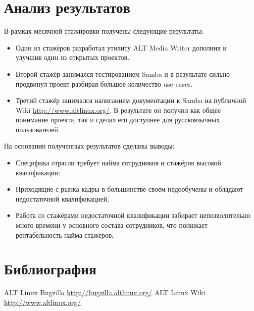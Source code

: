 \section{Анализ результатов}

В рамках месячной стажировки получены следующие результаты:

\begin{itemize}
\item Один из стажёров разработал утилиту ALT Media Writer дополнив и
улучшив один из открытых проектов.
\item Второй стажёр занимался тестированием Samba и в результате сильно
продвинул проект разбирая большое количество use-cases.
\item Третий стажёр занимался написанием документации к Samba на публичной
Wiki \url{http://www.altlinux.org/}. В результате он получил как
общее понимание проекта, так и сделал его доступнее для русскоязычных 
пользователей.
\end{itemize}

На основании полученных результатов сделаны выводы:

\begin{itemize}
\item Специфика отрасли требует найма сотрудников и стажёров высокой
квалификации;
\item Приходящие с рынка кадры в большинстве своём недообучены и
обладают недостаточной квалификацией;
\item Работа со стажёрами недостаточной квалификации забирает
непозволительно много времени у основного состава сотрудников, что
понижает рентабельность найма стажёров;
\end{itemize}


\section{Библиография}

\begin{thebibliography}{9}
 ALT Linux Bugzilla \url{http://bugzilla.altlinux.org/}
 ALT Linux Wiki \url{http://www.altlinux.org/}
\end{thebibliography}



